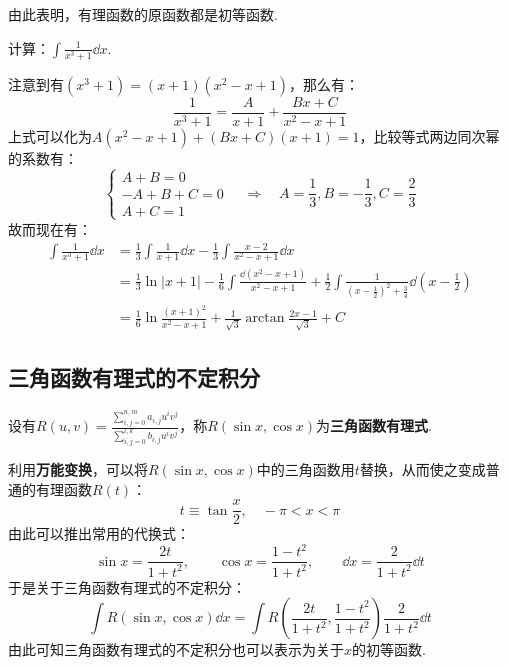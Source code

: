由此表明，有理函数的原函数都是初等函数.

\begin{question}
    计算：$\displaystyle\int\frac{1}{x^3+1}\dd{x}$.
\end{question}

\begin{solution}
    注意到有$(x^3+1) = (x+1)(x^2-x+1)$，那么有：
    \[\frac{1}{x^3+1} = \frac{A}{x+1} + \frac{Bx+C}{x^2-x+1}\]
    上式可以化为$A(x^2-x+1)+(Bx+C)(x+1)=1$，比较等式两边同次幂的系数有：
    \[\begin{cases}
        A+B = 0\\
        -A+B+C=0\\
        A+C=1
    \end{cases} \quad\Rightarrow\quad A=\frac{1}{3}, B=-\frac{1}{3}, C=\frac{2}{3}\]
    故而现在有：
    \begin{align*}
        \int\frac{1}{x^3+1}\dd{x} &= \frac{1}{3}\int\frac{1}{x+1}\dd{x} - \frac{1}{3}\int\frac{x-2}{x^2-x+1}\dd{x}\\
        &= \frac{1}{3}\ln|x+1| - \frac{1}{6}\int\frac{\dd{(x^2-x+1)}}{x^2-x+1} + \frac{1}{2}\int\frac{1}{\left(x-\frac{1}{2}\right)^2 + \frac{3}{4}}\dd{\left(x-\frac{1}{2}\right)}\\
        &= \frac{1}{6}\ln\frac{(x+1)^2}{x^2-x+1} + \frac{1}{\sqrt{3}}\arctan\frac{2x-1}{\sqrt{3}} + C
    \end{align*}
\end{solution}


\subsection{三角函数有理式的不定积分}
\begin{definition}
    设有$\displaystyle R(u,v) = \frac{\displaystyle\sum_{i,j=0}^{n,m}a_{i,j}u^i v^j}{\displaystyle\sum_{i,j=0}^{l,k}b_{i,j}u^i v^j}$，称$R(\sin x,\cos x)$为\textbf{三角函数有理式}.
\end{definition}

利用\textbf{万能变换}，可以将$R(\sin x,\cos x)$中的三角函数用$t$替换，从而使之变成普通的有理函数$R(t)$：
\[t \equiv \tan\frac{x}{2},\quad -\pi<x<\pi\]
由此可以推出常用的代换式：
\[\sin x = \frac{2t}{1+t^2}, \qquad \cos x =\frac{1-t^2}{1+t^2}, \qquad \dd{x} = \frac{2}{1+t^2}\dd{t}\]
于是关于三角函数有理式的不定积分：
\[\int R(\sin x,\cos x)\dd{x} = \int R\left(\frac{2t}{1+t^2},\frac{1-t^2}{1+t^2}\right)\frac{2}{1+t^2}\dd{t}\]
由此可知三角函数有理式的不定积分也可以表示为关于$x$的初等函数.

